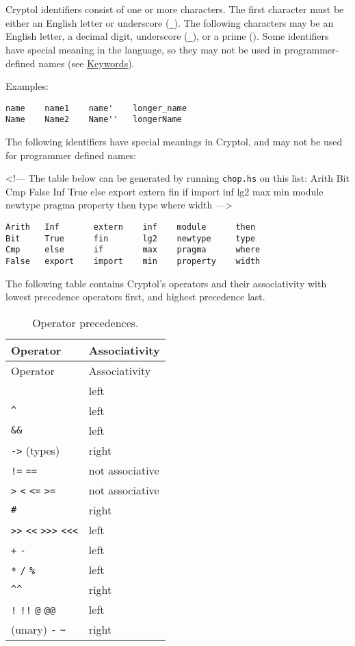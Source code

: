 Cryptol identifiers consist of one or more characters. The first
character must be either an English letter or underscore (\texttt{\_}).
The following characters may be an English letter, a decimal digit,
underscore (\texttt{\_}), or a prime (\texttt{\textquotesingle{}}). Some
identifiers have special meaning in the language, so they may not be
used in programmer-defined names (see
\hyperref[keywords-and-built-in-operators]{Keywords}).

Examples:

\begin{verbatim}
name    name1    name'    longer_name
Name    Name2    Name''   longerName
\end{verbatim}


The following identifiers have special meanings in Cryptol, and may not
be used for programmer defined names:

\textless{}!--- The table below can be generated by running
\texttt{chop.hs} on this list: Arith Bit Cmp False Inf True else export
extern fin if import inf lg2 max min module newtype pragma property then
type where width ---\textgreater{}

\begin{verbatim}
Arith   Inf       extern    inf    module      then     
Bit     True      fin       lg2    newtype     type     
Cmp     else      if        max    pragma      where    
False   export    import    min    property    width    
\end{verbatim}

The following table contains Cryptol's operators and their associativity
with lowest precedence operators first, and highest precedence last.

\begin{longtable}[c]{@{}ll@{}}
\caption{Operator precedences.}\tabularnewline
\toprule
Operator & Associativity\tabularnewline
\midrule
\endfirsthead
\toprule
Operator & Associativity\tabularnewline
\midrule
\endhead
\texttt{\textbar{}\textbar{}} & left\tabularnewline
\texttt{\^{}} & left\tabularnewline
\texttt{\&\&} & left\tabularnewline
\texttt{-\textgreater{}} (types) & right\tabularnewline
\texttt{!=} \texttt{==} & not associative\tabularnewline
\texttt{\textgreater{}} \texttt{\textless{}} \texttt{\textless{}=}
\texttt{\textgreater{}=} & not associative\tabularnewline
\texttt{\#} & right\tabularnewline
\texttt{\textgreater{}\textgreater{}} \texttt{\textless{}\textless{}}
\texttt{\textgreater{}\textgreater{}\textgreater{}}
\texttt{\textless{}\textless{}\textless{}} & left\tabularnewline
\texttt{+} \texttt{-} & left\tabularnewline
\texttt{*} \texttt{/} \texttt{\%} & left\tabularnewline
\texttt{\^{}\^{}} & right\tabularnewline
\texttt{!} \texttt{!!} \texttt{@} \texttt{@@} & left\tabularnewline
(unary) \texttt{-} \texttt{\textasciitilde{}} & right\tabularnewline
\bottomrule
\end{longtable}

